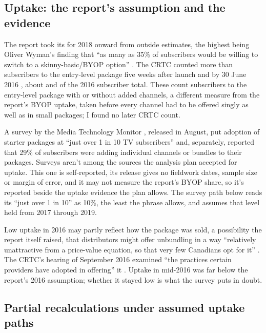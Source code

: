 \subsection{Uptake: the report's assumption and the evidence}

The report took its \lttvByopEighteen{} for 2018 onward from outside estimates, the highest being Oliver Wyman's finding that \enquote{as many as 35\% of subscribers would be willing to switch to a skinny-basic/BYOP option} \citep[para.~201, p.~75]{nordicity2015television}. The CRTC counted more than \lttvUptakeAprilN{} subscribers to the entry-level package five weeks after launch \citep{crtc2016basicpackage} and \lttvUptakeJuneN{} by 30 June 2016 \citep[para.~12]{crtc2016hearing0907}, about \lttvUptakeAprilShare{} and \lttvUptakeJuneShare{} of the 2016 subscriber total. These count subscribers to the entry-level package with or without added channels, a different measure from the report's BYOP uptake, taken before every channel had to be offered singly as well as in small packages; I found no later CRTC count.

A survey by the Media Technology Monitor \citeyearpar{mtm2017starter}, released in August, put adoption of starter packages at \enquote{just over 1 in 10 TV subscribers} and, separately, reported that 29\% of subscribers were adding individual channels or bundles to their packages. Surveys aren't among the sources the analysis plan accepted for uptake. This one is self-reported, its release gives no fieldwork dates, sample size or margin of error, and it may not measure the report's BYOP share, so it's reported beside the uptake evidence the plan allows. The survey path below reads its \enquote{just over 1 in 10} as 10\%, the least the phrase allows, and assumes that level held from 2017 through 2019.

Low uptake in 2016 may partly reflect how the package was sold, a possibility the report itself raised, that distributors might offer unbundling in a way \enquote{relatively unattractive from a price-value equation, so that very few Canadians opt for it} \citep[para.~78, n.~40, p.~34]{nordicity2015television}. The CRTC's hearing of September 2016 examined \enquote{the practices certain providers have adopted in offering} it \citep[para.~5]{crtc2016hearing0907}. Uptake in mid-2016 was far below the report's 2016 assumption; whether it stayed low is what the survey puts in doubt.

\subsection{Partial recalculations under assumed uptake paths}

